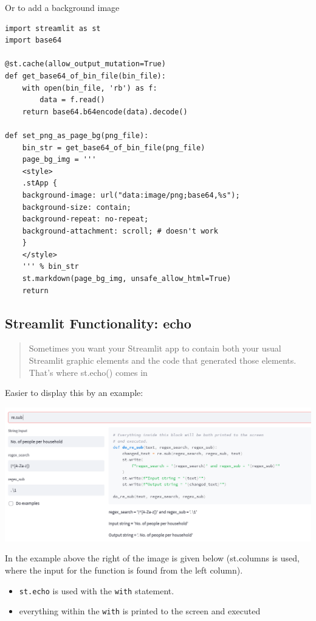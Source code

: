 \documentclass[
  letterpaper,
  DIV=11,
  numbers=noendperiod]{scrartcl}
\providecommand{\tightlist}{%
  \setlength{\itemsep}{0pt}\setlength{\parskip}{0pt}}\usepackage{longtable,booktabs,array}
\begin{document}
Or to add a background image

\begin{verbatim}
import streamlit as st
import base64

@st.cache(allow_output_mutation=True)
def get_base64_of_bin_file(bin_file):
    with open(bin_file, 'rb') as f:
        data = f.read()
    return base64.b64encode(data).decode()

def set_png_as_page_bg(png_file):
    bin_str = get_base64_of_bin_file(png_file) 
    page_bg_img = '''
    <style>
    .stApp {
    background-image: url("data:image/png;base64,%s");
    background-size: contain;
    background-repeat: no-repeat;
    background-attachment: scroll; # doesn't work
    }
    </style>
    ''' % bin_str
    st.markdown(page_bg_img, unsafe_allow_html=True)
    return
\end{verbatim}

\hypertarget{streamlit-functionality-echo}{%
\subsection{Streamlit Functionality:
echo}\label{streamlit-functionality-echo}}

\begin{quote}
Sometimes you want your Streamlit app to contain both your usual
Streamlit graphic elements and the code that generated those elements.
That's where st.echo() comes in
\end{quote}

Easier to display this by an example:

\includegraphics{ghtop_images/streamlit_echo.png}

In the example above the right of the image is given below (st.columns
is used, where the input for the function is found from the left
column).

\begin{itemize}
\tightlist
\item
  \texttt{st.echo} is used with the \texttt{with} statement.
\item
  everything within the \texttt{with} is printed to the screen and
  executed
\end{itemize}
\end{document}
